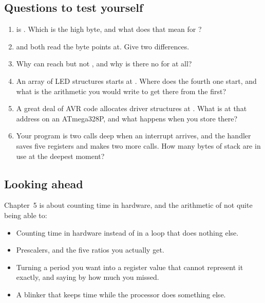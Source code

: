 \subsection*{Questions to test yourself}
\begin{enumerate}
  \item {} is . Which is the high byte, and what does that mean for
    ?
  \item {} and  both read the byte  points at. Give two
    differences.
  \item Why can  reach  but not , and why is there no  for
     at all?
  \item An array of LED structures starts at . Where does the fourth one start, and
    what is the arithmetic you would write to get there from the first?
  \item A great deal of AVR code allocates driver structures at . What is at that
    address on an ATmega328P, and what happens when you store there?
  \item Your program is two calls deep when an interrupt arrives, and the handler saves five
    registers and makes two more calls. How many bytes of stack are in use at the deepest moment?
\end{enumerate}

\subsection*{Looking ahead}
Chapter~5 is about counting time in hardware, and the arithmetic of not quite being able to:
\begin{itemize}
  \item Counting time in hardware instead of in a loop that does nothing else.
  \item Prescalers, and the five ratios you actually get.
  \item Turning a period you want into a register value that cannot represent it exactly, and
    saying by how much you missed.
  \item A blinker that keeps time while the processor does something else.
\end{itemize}
